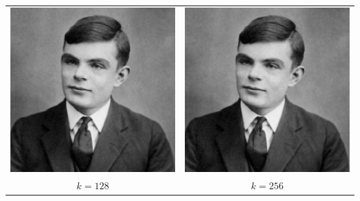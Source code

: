 \documentclass[11pt,letter,notitlepage]{article}
\begin{document}
\begin{solution}
\begin{enumerate}
\begin{center}
\begin{tabular}{cc}
                      \includegraphics[width=0.3\columnwidth]{solution7.4_img/Alan_Turing_k=128.pdf}
                              & \includegraphics[width=0.3\columnwidth]{solution7.4_img/Alan_Turing_k=256.pdf} \\
                      $k=128$ & $k=256$
                  \end{tabular}
              \end{center}
    \end{enumerate}
\end{solution}

\newpage
\end{document}
